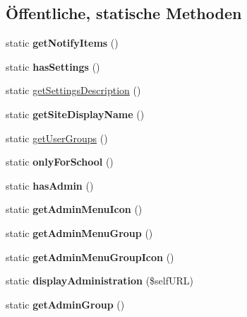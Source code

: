\subsection*{Öffentliche, statische Methoden}
\begin{DoxyCompactItemize}
\item 
\mbox{\label{classschuelerinfo_a8d6ecb7f495b134df0e28e1e66c1af56}} 
static {\bfseries get\+Notify\+Items} ()
\item 
\mbox{\label{classschuelerinfo_ad9e93e4b07ee3e1f33aa31014109a6eb}} 
static {\bfseries has\+Settings} ()
\item 
static \mbox{\hyperlink{classschuelerinfo_a9d6ca22d0230a7cacdd8bf6b577ddf9c}{get\+Settings\+Description}} ()
\item 
\mbox{\label{classschuelerinfo_a6454b5f74652539e7d2e29f5b44dfbe1}} 
static {\bfseries get\+Site\+Display\+Name} ()
\item 
static \mbox{\hyperlink{classschuelerinfo_afea1a1c3f6b20ca1ffb28bbefeec694e}{get\+User\+Groups}} ()
\item 
\mbox{\label{classschuelerinfo_abbad27f3f449d1027faaa1af707698e8}} 
static {\bfseries only\+For\+School} ()
\item 
\mbox{\label{classschuelerinfo_afd3137f9419199542796b86684ab085b}} 
static {\bfseries has\+Admin} ()
\item 
\mbox{\label{classschuelerinfo_ae13369b0b53dfa931498d0c882325d56}} 
static {\bfseries get\+Admin\+Menu\+Icon} ()
\item 
\mbox{\label{classschuelerinfo_aa71a97c8e6abf424a945ae488c9fb92b}} 
static {\bfseries get\+Admin\+Menu\+Group} ()
\item 
\mbox{\label{classschuelerinfo_a024cffa650d2c68d25a354caa9af0b8f}} 
static {\bfseries get\+Admin\+Menu\+Group\+Icon} ()
\item 
\mbox{\label{classschuelerinfo_a4ce61b9e5b0eb4d752471f1890a3a6a0}} 
static {\bfseries display\+Administration} (\$self\+U\+RL)
\item 
\mbox{\label{classschuelerinfo_a5779fdaafcbfae5827c009e0a49cffd5}} 
static {\bfseries get\+Admin\+Group} ()
\end{DoxyCompactItemize}
